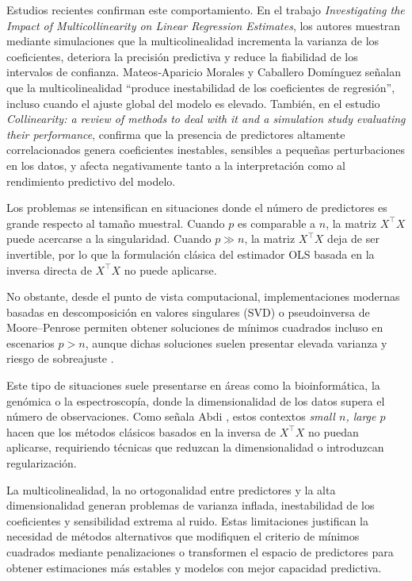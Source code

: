 \documentclass[12pt,a4paper]{report}
\begin{document}
Estudios recientes confirman este comportamiento. En el trabajo \textit{Investigating the Impact of Multicollinearity on Linear Regression Estimates}\cite{akinwande2015}, los autores muestran mediante simulaciones que la multicolinealidad incrementa la varianza de los coeficientes, deteriora la precisión predictiva y reduce la fiabilidad de los intervalos de confianza. Mateos‑Aparicio Morales y Caballero Domínguez \cite{mateos2007} señalan que la multicolinealidad “produce inestabilidad de los coeficientes de regresión”, incluso cuando el ajuste global del modelo es elevado. También, en el estudio \textit{Collinearity: a review of methods to deal with it and a simulation study evaluating their performance}\cite{dormann2013}, confirma que la presencia de predictores altamente correlacionados genera coeficientes inestables, sensibles a pequeñas perturbaciones en los datos, y afecta negativamente tanto a la interpretación como al rendimiento predictivo del modelo.

Los problemas se intensifican en situaciones donde el número de predictores es grande respecto al tamaño muestral. Cuando \(p\) es comparable a \(n\), la matriz \(X^\top X\) puede acercarse a la singularidad. Cuando \(p \gg n\), la matriz \(X^\top X\) deja de ser invertible, por lo que la formulación clásica del estimador OLS basada en la inversa directa de \(X^\top X\) no puede aplicarse.

No obstante, desde el punto de vista computacional, implementaciones modernas basadas en descomposición en valores singulares (SVD) o pseudoinversa de Moore--Penrose permiten obtener soluciones de mínimos cuadrados incluso en escenarios \(p > n\), aunque dichas soluciones suelen presentar elevada varianza y riesgo de sobreajuste \cite{hastie2009}.

Este tipo de situaciones suele presentarse en áreas como la bioinformática, la genómica o la espectroscopía, donde la dimensionalidad de los datos supera el número de observaciones. Como señala Abdi \cite{abdi2010}, estos contextos \textit{small \(n\), large \(p\)} hacen que los métodos clásicos basados en la inversa de \(X^\top X\) no puedan aplicarse, requiriendo técnicas que reduzcan la dimensionalidad o introduzcan regularización.

La multicolinealidad, la no ortogonalidad entre predictores y la alta dimensionalidad  generan problemas de varianza inflada, inestabilidad de los coeficientes y sensibilidad extrema al ruido. Estas limitaciones justifican la necesidad de métodos alternativos que modifiquen el criterio de mínimos cuadrados mediante penalizaciones o transformen el espacio de predictores para obtener estimaciones más estables y modelos con mejor capacidad predictiva.
\end{document}
